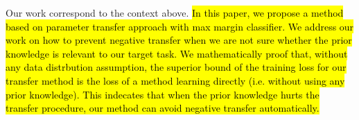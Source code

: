 Our work correspond to the context above. \hl{In this paper, we propose a method based on parameter transfer approach with max margin classifier. We address our work on how to prevent negative transfer when we are not sure whether the prior knowledge is relevant to our target task. We mathematically proof that, without any data distrbution assumption, the superior bound of the training loss for our transfer method is the loss of a method learning directly (i.e. without using any prior knowledge). This indecates that when the prior knowledge hurts the transfer procedure, our method can avoid negative transfer automatically.} 
